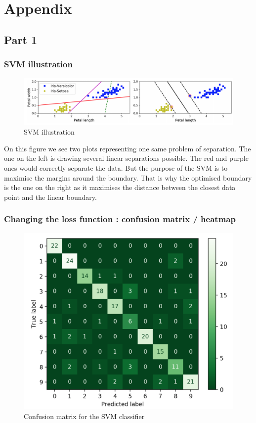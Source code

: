 \section{Appendix}



\subsection{Part 1}
\subsubsection{SVM illustration}
\label{appendix:part1svm}
\begin{figure}[ht]
	\centering 
	\includegraphics[scale = 0.3]{Pics/SVM}
	\caption{SVM illustration}
	\label{fig:svmex}
\end{figure}

On this figure we see two plots representing one same problem of separation. The one on the left is drawing several linear separations possible. The red and purple ones would correctly separate the data. But the purpose of the SVM is to maximise the margins around the boundary. That is why the optimised boundary is the one on the right as it maximises the distance between the closest data point and the linear boundary. 

\subsubsection{Changing the loss function : confusion matrix / heatmap}
\label{appendix:changingloss}
\begin{figure}[h]
	\centering 
	\includegraphics[scale=0.4]{Pics/confusion_matrixr}
	\caption{Confusion matrix for the SVM classifier}
	\label{fig:confusion}
\end{figure}

